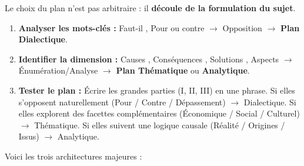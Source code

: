 \documentclass[11pt]{article}
\begin{document}
\medskip
\noindent Le choix du plan n'est pas arbitraire : il \textbf{découle de la formulation du sujet}.

\begin{methode}
\begin{enumerate}
    \item \textbf{Analyser les mots-clés :} \og Faut-il \fg{}, \og Pour ou contre \fg{} $\rightarrow$ Opposition $\rightarrow$ \textbf{Plan Dialectique}.
    \item \textbf{Identifier la dimension :} \og Causes \fg{}, \og Conséquences \fg{}, \og Solutions \fg{}, \og Aspects \fg{} $\rightarrow$ Énumération/Analyse $\rightarrow$ \textbf{Plan Thématique} ou \textbf{Analytique}.
    \item \textbf{Tester le plan :} Écrire les grandes parties (I, II, III) en une phrase. Si elles s'opposent naturellement (Pour / Contre / Dépassement) $\rightarrow$ Dialectique. Si elles explorent des facettes complémentaires (Économique / Social / Culturel) $\rightarrow$ Thématique. Si elles suivent une logique causale (Réalité / Origines / Issus) $\rightarrow$ Analytique.
\end{enumerate}
\end{methode}

\medskip
\noindent Voici les trois architectures majeures :
\end{document}
